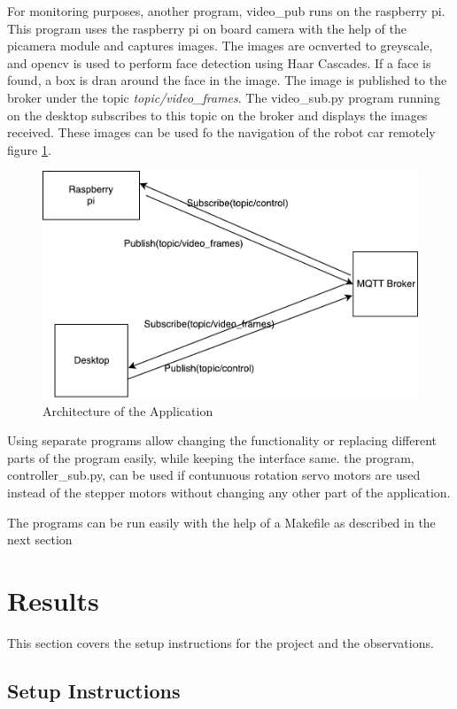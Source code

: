 \documentclass[sigconf]{acmart}
\begin{document}
For monitoring purposes, another program, video\_pub runs on the raspberry pi. This program uses the raspberry pi on board camera with the help of the picamera module and captures images. The images are ocnverted to greyscale, and opencv is used to perform face detection using Haar Cascades. If a face is found, a box is dran around the face in the image. The image is published to the broker under the topic {\em topic/video\_frames}. The video\_sub.py program running on the desktop subscribes to this topic on the broker and displays the images received. These images can be used fo the navigation of the robot car remotely figure \ref{f:arch}.

\begin{figure}[!ht]
  \centering\includegraphics[width=\columnwidth]{images/architecture.pdf}
  \caption{Architecture of the Application}\label{f:arch}
\end{figure}

Using separate programs allow changing the functionality or replacing different parts of the program easily, while keeping the interface same. the program, controller\_sub.py, can be used if contunuous rotation servo motors are used instead of the stepper motors without changing any other part of the application.

The programs can be run easily with the help of a Makefile as described in the next section
\section{Results}
This section covers the setup instructions for the project and the observations.

\subsection{Setup Instructions}
\end{document}
